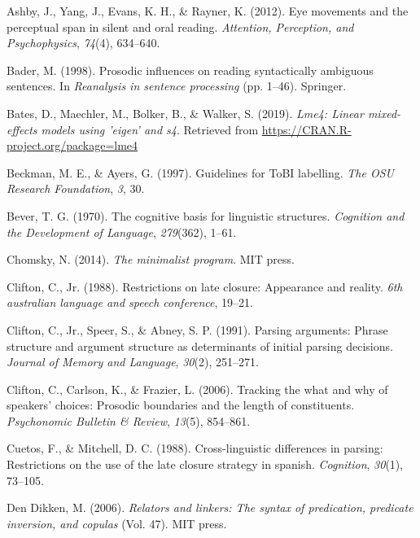 \documentclass[12pt,oneside]{book}
\begin{document}
\hypertarget{refs}{}
\leavevmode\hypertarget{ref-ashby2012eye}{}%
Ashby, J., Yang, J., Evans, K. H., \& Rayner, K. (2012). Eye movements and the perceptual span in silent and oral reading. \emph{Attention, Perception, and Psychophysics}, \emph{74}(4), 634--640.

\leavevmode\hypertarget{ref-Bader1998-ts}{}%
Bader, M. (1998). Prosodic influences on reading syntactically ambiguous sentences. In \emph{Reanalysis in sentence processing} (pp. 1--46). Springer.

\leavevmode\hypertarget{ref-R-lme4}{}%
Bates, D., Maechler, M., Bolker, B., \& Walker, S. (2019). \emph{Lme4: Linear mixed-effects models using 'eigen' and s4}. Retrieved from \url{https://CRAN.R-project.org/package=lme4}

\leavevmode\hypertarget{ref-Beckman1997-eu}{}%
Beckman, M. E., \& Ayers, G. (1997). Guidelines for ToBI labelling. \emph{The OSU Research Foundation}, \emph{3}, 30.

\leavevmode\hypertarget{ref-bever1970}{}%
Bever, T. G. (1970). The cognitive basis for linguistic structures. \emph{Cognition and the Development of Language}, \emph{279}(362), 1--61.

\leavevmode\hypertarget{ref-chomsky2014minimalist}{}%
Chomsky, N. (2014). \emph{The minimalist program}. MIT press.

\leavevmode\hypertarget{ref-clifton1988restrictions}{}%
Clifton, C., Jr. (1988). Restrictions on late closure: Appearance and reality. \emph{6th australian language and speech conference}, 19--21.

\leavevmode\hypertarget{ref-cliftonEtAl1991}{}%
Clifton, C., Jr., Speer, S., \& Abney, S. P. (1991). Parsing arguments: Phrase structure and argument structure as determinants of initial parsing decisions. \emph{Journal of Memory and Language}, \emph{30}(2), 251--271.

\leavevmode\hypertarget{ref-lengthCCFL}{}%
Clifton, C., Carlson, K., \& Frazier, L. (2006). Tracking the what and why of speakers' choices: Prosodic boundaries and the length of constituents. \emph{Psychonomic Bulletin \& Review}, \emph{13}(5), 854--861.

\leavevmode\hypertarget{ref-Cuetos1988-tm}{}%
Cuetos, F., \& Mitchell, D. C. (1988). Cross-linguistic differences in parsing: Restrictions on the use of the late closure strategy in spanish. \emph{Cognition}, \emph{30}(1), 73--105.

\leavevmode\hypertarget{ref-den2006relators}{}%
Den Dikken, M. (2006). \emph{Relators and linkers: The syntax of predication, predicate inversion, and copulas} (Vol. 47). MIT press.
\end{document}
